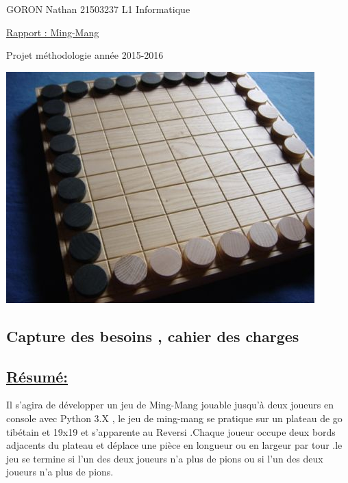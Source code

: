 \documentclass[a4paper,12pt]{article}
\begin{document}
\begin{titlepage}

\begin{flushleft}
GORON Nathan 21503237
\newline
L1 Informatique
\end{flushleft}
\vspace{1cm}
\begin{center}
\begin{huge}
\underline{Rapport : Ming-Mang}
\end{huge}
\end{center}

\begin{center}
\begin{large}
Projet méthodologie année 2015-2016
\vspace{3cm}
\end{large}

\includegraphics[scale=0.5]{images/mingmang.jpg}
\end{center}
\end{titlepage}
\newpage









\newpage
\begin{center}
\section{Capture des besoins , cahier des charges}
\vspace{2cm}

\subsection{\underline{Résumé:}}
\vspace{1cm}
Il s'agira de développer un jeu de Ming-Mang jouable jusqu'à deux joueurs en console avec Python 3.X , le jeu de ming-mang se pratique sur un plateau de go tibétain et 19x19 et s'apparente au Reversi .Chaque joueur occupe deux bords adjacents du plateau et déplace une pièce en longueur ou en largeur par tour .le jeu se termine si l'un des deux joueurs n'a plus de pions ou si l'un  des deux joueurs n'a plus de pions.

\end{center}
\end{document}
